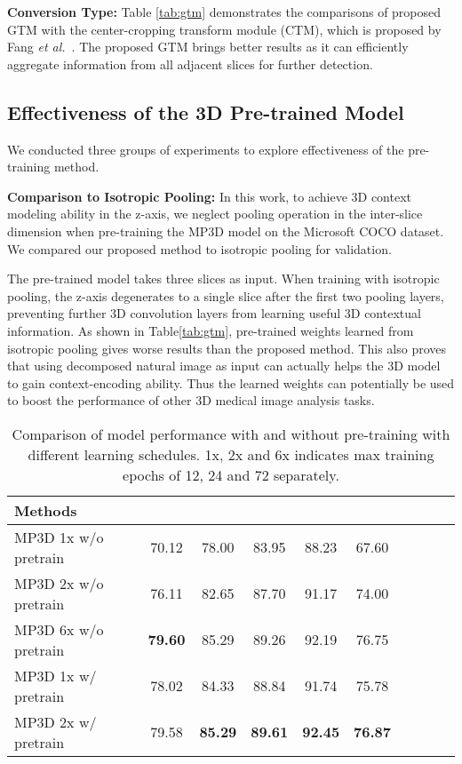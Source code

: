 \documentclass[runningheads]{llncs}
\begin{document}
\noindent\textbf{Conversion Type:} Table \ref{tab:gtm} demonstrates the comparisons of proposed GTM with the center-cropping transform module (CTM), which is proposed by Fang \textit{et al.}~\cite{PFN}. The proposed GTM brings better results as it can efficiently aggregate information from all adjacent slices for further detection.



\subsection{Effectiveness of the 3D Pre-trained Model}

We conducted three groups of experiments to explore effectiveness of the pre-training method.


\noindent\textbf{Comparison to Isotropic Pooling:} In this work, to achieve 3D context modeling ability in the z-axis, we neglect pooling operation in the inter-slice dimension when pre-training the MP3D model on the Microsoft COCO dataset. We compared our proposed method to isotropic pooling for validation.  

The pre-trained model takes three slices as input. When training with isotropic pooling, the z-axis degenerates to a single slice after the first two pooling layers, preventing further 3D convolution layers from learning useful 3D contextual information. As shown in Table\ref{tab:gtm}, pre-trained weights learned from isotropic pooling gives worse results than the proposed method. This also proves that using decomposed natural image as input can actually helps the 3D model to gain context-encoding ability. Thus the learned weights can potentially be used to boost the performance of other 3D medical image analysis tasks.

\begin{table}[!t]
    \caption{Comparison of model performance with and without pre-training with different learning schedules. 1x, 2x and 6x indicates max training epochs of 12, 24 and 72 separately.}
    \label{tab:scratch}
    \centering
    \footnotesize \setlength{\tabcolsep}{8pt}\renewcommand{\arraystretch}{1.2}\centering
        \label{tab:scratch}
        \begin{tabular}{lccccccccc}
            \textbf{Methods} &  &  &  &  &  \\
\hline
            \hline
            MP3D  1x w/o pretrain   &	70.12&	78.00&	83.95&	88.23&67.60 \\
            MP3D  2x w/o pretrain  &	76.11&	82.65&	87.70&	91.17&74.00 \\
	    MP3D  6x w/o pretrain &\textbf{79.60} &	85.29&	89.26&	92.19& 76.75\\
	    \hline
           MP3D  1x w/ pretrain &78.02&	84.33&	88.84&	91.74&75.78\\
	    MP3D  2x w/ pretrain&79.58&        \textbf{85.29}&	\textbf{89.61}&	\textbf{92.45}&\textbf{76.87}\\
        \end{tabular}
\end{table}
\end{document}
